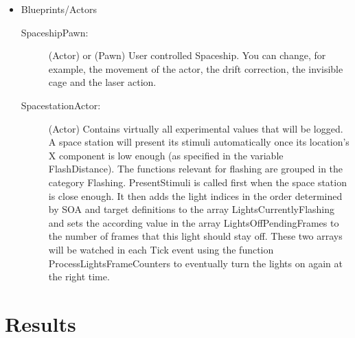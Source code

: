 \documentclass[11pt,a4paper]{article}
\begin{document}
\begin{itemize}
    \item Blueprints/Actors
        \begin{description}
        \item[SpaceshipPawn:] (Actor) or (Pawn) User controlled Spaceship. You can change, for example, the movement of the actor, the drift correction, the invisible cage and the laser action.
        \item[SpacestationActor:] (Actor) Contains virtually all experimental values that will be logged. A space station will present its stimuli automatically once its location's X component is low enough (as specified in the variable FlashDistance). The functions relevant for flashing are grouped in the category Flashing. PresentStimuli is called first when the space station is close enough. It then adds the light indices in the order determined by SOA and target definitions to the array LightsCurrentlyFlashing and sets the according value in the array LightsOffPendingFrames to the number of frames that this light should stay off. These two arrays will be watched in each Tick event using the function ProcessLightsFrameCounters to eventually turn the lights on again at the right time.
        \end{description}


    \end{itemize} 
    
        
    \section{Results}
        
\end{document}
